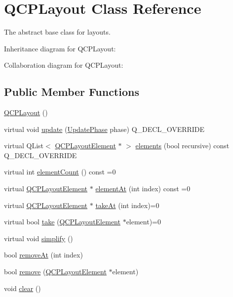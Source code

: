 \hypertarget{classQCPLayout}{}\section{Q\+C\+P\+Layout Class Reference}
\label{classQCPLayout}


The abstract base class for layouts.  




Inheritance diagram for Q\+C\+P\+Layout\+:


Collaboration diagram for Q\+C\+P\+Layout\+:
\subsection*{Public Member Functions}
\begin{DoxyCompactItemize}
\item 
\hyperlink{classQCPLayout_a04222e6e1361fd802d48f1a25b7020d4}{Q\+C\+P\+Layout} ()
\item 
virtual void \hyperlink{classQCPLayout_a48ecc9c98ea90b547c3e27a931a8f7bd}{update} (\hyperlink{classQCPLayoutElement_a0d83360e05735735aaf6d7983c56374d}{Update\+Phase} phase) Q\+\_\+\+D\+E\+C\+L\+\_\+\+O\+V\+E\+R\+R\+I\+DE
\item 
virtual Q\+List$<$ \hyperlink{classQCPLayoutElement}{Q\+C\+P\+Layout\+Element} $\ast$ $>$ \hyperlink{classQCPLayout_aca129722c019f91d3367046f80abfa77}{elements} (bool recursive) const Q\+\_\+\+D\+E\+C\+L\+\_\+\+O\+V\+E\+R\+R\+I\+DE
\item 
virtual int \hyperlink{classQCPLayout_a39d3e9ef5d9b82ab1885ba1cb9597e56}{element\+Count} () const =0
\item 
virtual \hyperlink{classQCPLayoutElement}{Q\+C\+P\+Layout\+Element} $\ast$ \hyperlink{classQCPLayout_afa73ca7d859f8a3ee5c73c9b353d2a56}{element\+At} (int index) const =0
\item 
virtual \hyperlink{classQCPLayoutElement}{Q\+C\+P\+Layout\+Element} $\ast$ \hyperlink{classQCPLayout_a5a79621fa0a6eabb8b520cfc04fb601a}{take\+At} (int index)=0
\item 
virtual bool \hyperlink{classQCPLayout_ada26cd17e56472b0b4d7fbbc96873e4c}{take} (\hyperlink{classQCPLayoutElement}{Q\+C\+P\+Layout\+Element} $\ast$element)=0
\item 
virtual void \hyperlink{classQCPLayout_a41e6ac049143866e8f8b4964efab01b2}{simplify} ()
\item 
bool \hyperlink{classQCPLayout_a2403f684fee3ce47132faaeed00bb066}{remove\+At} (int index)
\item 
bool \hyperlink{classQCPLayout_a6c58f537d8086f352576ab7c5b15d0bc}{remove} (\hyperlink{classQCPLayoutElement}{Q\+C\+P\+Layout\+Element} $\ast$element)
\item 
void \hyperlink{classQCPLayout_a02883bdf2769b5b227f0232dba1ac4ee}{clear} ()
\end{DoxyCompactItemize}
